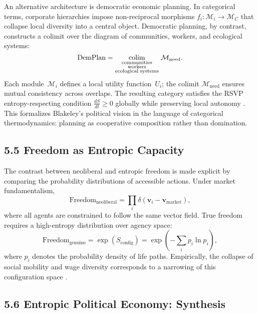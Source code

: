 \documentclass[11pt,a4paper,titlepage]{article}
\theoremstyle{definition}
\begin{document}
An alternative architecture is democratic economic planning.
In categorical terms, corporate hierarchies impose non-reciprocal morphisms
$f_i\!: \mathcal{M}_i \to \mathcal{M}_C$ that collapse local diversity into a
central object.
Democratic planning, by contrast, constructs a colimit over the diagram of
communities, workers, and ecological systems:
\begin{equation}
\text{DemPlan} =
   \underset{\substack{\text{communities}\\
                      \text{workers}\\
                      \text{ecological\;systems}}}
             {\mathrm{colim}}\;
   \mathcal{M}_{\text{need}}.
\label{eq:democratic_colimit}
\end{equation}
Each module~$\mathcal{M}_i$ defines a local utility function~$U_i$; the colimit
$\mathcal{M}_{\text{need}}$ ensures mutual consistency across overlaps.
The resulting category satisfies the RSVP entropy-respecting condition
$\frac{dS}{dt}\!\ge\!0$ globally while preserving local autonomy
\cite{baez2017,baez2022,ostrom1990,hayek1945}.
This formalizes Blakeley’s political vision in the language of categorical
thermodynamics: planning as cooperative composition rather than domination.

\subsection{5.5 Freedom as Entropic Capacity}

The contrast between neoliberal and entropic freedom is made explicit by
comparing the probability distributions of accessible actions.
Under market fundamentalism,
\begin{equation}
\text{Freedom}_{\text{neoliberal}}
   = \prod_i \delta(\mathbf{v}_i - \mathbf{v}_{\text{market}}),
\label{eq:pseudo_freedom}
\end{equation}
where all agents are constrained to follow the same vector field.
True freedom requires a high-entropy distribution over agency space:
\begin{equation}
\text{Freedom}_{\text{genuine}}
   = \exp(S_{\text{config}})
   = \exp\!\left(-\sum_i p_i\ln p_i\right),
\label{eq:true_freedom}
\end{equation}
where $p_i$ denotes the probability density of life paths.
Empirically, the collapse of social mobility and wage diversity corresponds to
a narrowing of this configuration space \cite{blakeley2024,wallerstein2004}.

\subsection{5.6 Entropic Political Economy: Synthesis}
\end{document}
